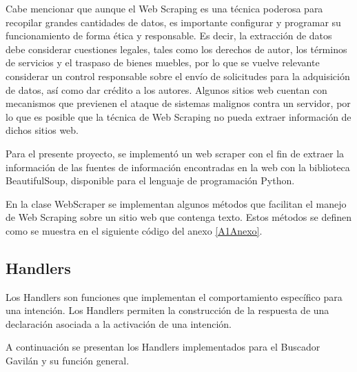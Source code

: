 Cabe mencionar que aunque el Web Scraping es una técnica poderosa para recopilar grandes cantidades de datos, es importante configurar y programar su funcionamiento de forma ética y responsable. Es decir, la extracción de datos debe considerar cuestiones legales, tales como los derechos de autor, los términos de servicios y el traspaso de bienes muebles, por lo que se vuelve relevante considerar un control responsable sobre el envío de solicitudes para la adquisición de datos, así como dar crédito a los autores. Algunos sitios web cuentan con mecanismos que previenen el ataque de sistemas malignos contra un servidor, por lo que es posible que la técnica de Web Scraping no pueda extraer información de dichos sitios web.

Para el presente proyecto, se implementó un web scraper con el fin de extraer la información de las fuentes de información encontradas en la web con la biblioteca BeautifulSoup, disponible para el lenguaje de programación Python.

En la clase WebScraper se implementan algunos métodos que facilitan el manejo de Web Scraping sobre un sitio web que contenga texto. Estos métodos se definen como se muestra en el siguiente código del anexo \ref{A1Anexo}.


\subsection{Handlers}
\label{HandlerscapIV}

Los Handlers son funciones que implementan el comportamiento específico para una intención. Los Handlers permiten la construcción de la respuesta de una declaración asociada a la activación de una intención.

A continuación se presentan los Handlers implementados para el Buscador Gavilán y su función general.

